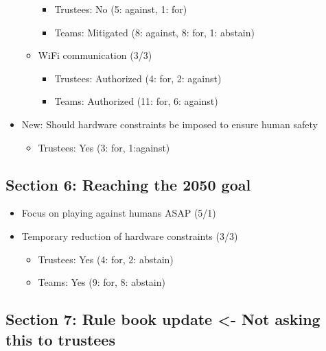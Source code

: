 \documentclass{article}
\begin{document}
\begin{itemize}
\begin{itemize}
       \begin{itemize} 
           \item Trustees: No (5: against, 1: for)
           \item Teams: Mitigated (8: against, 8: for, 1: abstain)
   \end{itemize}
       \item WiFi communication (3/3)
       \begin{itemize} 
           \item Trustees: Authorized (4: for, 2: against)
           \item Teams: Authorized (11: for, 6: against)
\end{itemize}
\end{itemize}
   \item New: Should hardware constraints be imposed to ensure human safety
   \begin{itemize} 
       \item Trustees: Yes (3: for, 1:against)
   \end{itemize}

\end{itemize}
\subsection{Section 6: Reaching the 2050 goal}

\begin{itemize} 
   \item Focus on playing against humans ASAP (5/1)
   \item Temporary reduction of hardware constraints (3/3)
   \begin{itemize} 
       \item Trustees: Yes (4: for, 2: abstain)
       \item Teams: Yes (9: for, 8: abstain)
   \end{itemize}

\end{itemize}
\subsection{Section 7: Rule book update <- Not asking this to trustees}
\end{document}
